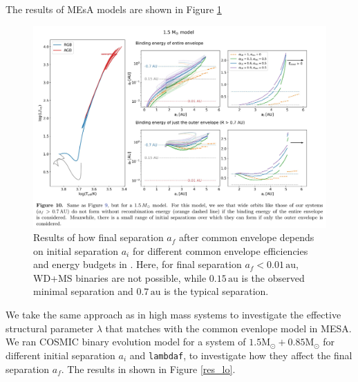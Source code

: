 \documentclass[12pt]{article}
\newcommand{\Msun}{\mathrm{M_{\odot}}}
\newcommand{\au}{\, \mathrm{au}}
\begin{document}
The results of MEsA models are shown in Figure \ref{yam_lo}

\begin{figure}
    \centering
    \includegraphics[width=\linewidth]{fig/yamaguchi-1.5+0.8.png}
    \caption{Results of how final separation $a_f$ after common envelope depends on initial separation $a_i$ for different common envelope efficiencies and energy budgets in \cite{yamaguchi_lo}. Here, for final separation $a_f <0.01\au$, WD+MS binaries are not possible, while $0.15\au$ is the observed minimal separation and $0.7\au$ is the typical separation.}
    \label{yam_lo}
\end{figure}

We take the same approach as in high mass systems to investigate the effective structural parameter $\lambda$ that matches with the common evenlope model in MESA. We ran COSMIC binary evolution model for a system of $1.5\Msun + 0.85\Msun$ for different initial separation $a_i$ and \verb|lambdaf|, to investigate how they affect the final separation $a_f$. The results in shown in Figure \ref{res_lo}.
\end{document}
